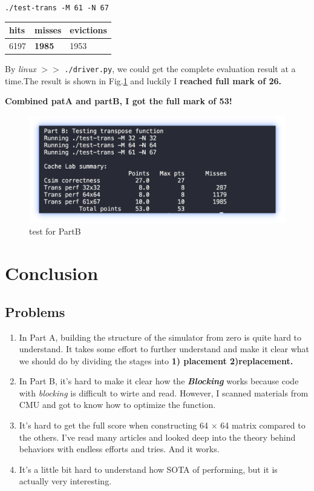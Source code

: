 \documentclass{article}
\begin{document}
{\color{blue} \lstinline|./test-trans -M 61 -N 67|}
\begin{table}[!h]
	\centering  %
	\label{table1}  %
	\begin{tabular}{| m{3cm} | m{3cm} | m{3cm} |}
		\hline  %
		hits&misses&evictions \\  %
		\hline
		6197&\textbf{1985}&1953 \\
		\hline
	\end{tabular}
\end{table}


By {\color{blue} \textit{linux} $>>$ \lstinline|./driver.py|}, we could get the complete evaluation result at a time.The result is shown in Fig.\ref{fig:2} and luckily I \textbf{reached full mark of 26. }

\textbf{Combined patA and partB, I got the full mark of 53!}
\begin{figure}[!h]
	\centering
	\includegraphics[width=\linewidth]{2}
	\caption{test for PartB}
	\label{fig:2}
\end{figure}


\section{Conclusion}

\subsection{Problems}
\begin{enumerate}
	\item In Part A, building the structure of the simulator from zero is quite hard to understand. It takes some effort to further understand and make it clear what we should do by dividing the stages into \textbf{1) placement 2)replacement. }
	\item In Part B, it's hard to make it clear how the \textit{\textbf{Blocking}} works because code with \textit{blocking} is difficult to wirte and read. However, I scanned materials from CMU and got to know how to optimize the function.
	\item It's hard to get the full score when constructing 64 $\times$ 64 matrix compared to the others. I've read many articles and looked deep into the theory behind behaviors with endless efforts and tries. And it works.
	\item It's a little bit hard to understand how SOTA of performing, but it is actually very interesting.
\end{enumerate}
\end{document}
